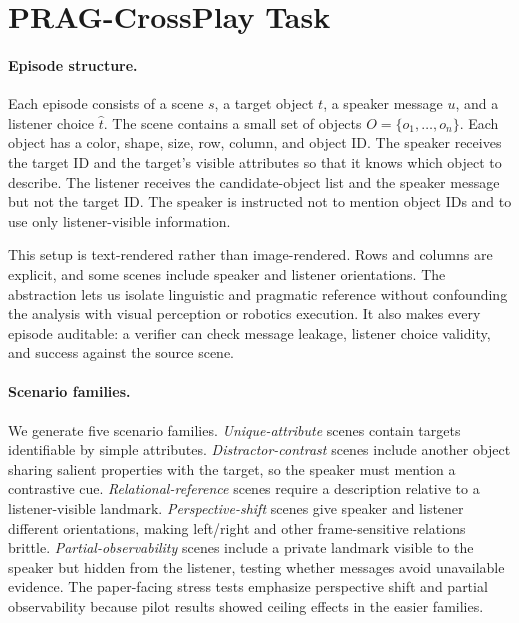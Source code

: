 \section{PRAG-CrossPlay Task}

\paragraph{Episode structure.}
Each episode consists of a scene $s$, a target object $t$, a speaker message $u$, and a listener choice $\hat{t}$. The scene contains a small set of objects $O=\{o_1,\ldots,o_n\}$. Each object has a color, shape, size, row, column, and object ID. The speaker receives the target ID and the target's visible attributes so that it knows which object to describe. The listener receives the candidate-object list and the speaker message but not the target ID. The speaker is instructed not to mention object IDs and to use only listener-visible information.

This setup is text-rendered rather than image-rendered. Rows and columns are explicit, and some scenes include speaker and listener orientations. The abstraction lets us isolate linguistic and pragmatic reference without confounding the analysis with visual perception or robotics execution. It also makes every episode auditable: a verifier can check message leakage, listener choice validity, and success against the source scene.

\paragraph{Scenario families.}
We generate five scenario families. \emph{Unique-attribute} scenes contain targets identifiable by simple attributes. \emph{Distractor-contrast} scenes include another object sharing salient properties with the target, so the speaker must mention a contrastive cue. \emph{Relational-reference} scenes require a description relative to a listener-visible landmark. \emph{Perspective-shift} scenes give speaker and listener different orientations, making left/right and other frame-sensitive relations brittle. \emph{Partial-observability} scenes include a private landmark visible to the speaker but hidden from the listener, testing whether messages avoid unavailable evidence. The paper-facing stress tests emphasize perspective shift and partial observability because pilot results showed ceiling effects in the easier families.

